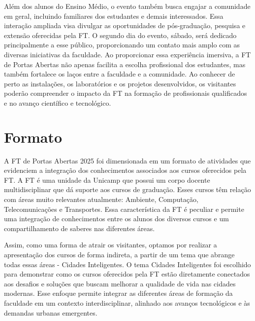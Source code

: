 \documentclass[
  letterpaper,
  DIV=11,
  numbers=noendperiod]{scrreprt}
\begin{document}
Além dos alunos do Ensino Médio, o evento também busca engajar a
comunidade em geral, incluindo familiares dos estudantes e demais
interessados. Essa interação ampliada visa divulgar as oportunidades de
pós-graduação, pesquisa e extensão oferecidas pela FT. O segundo dia do
evento, sábado, será dedicado principalmente a esse público,
proporcionando um contato mais amplo com as diversas iniciativas da
faculdade. Ao proporcionar essa experiência imersiva, a FT de Portas
Abertas não apenas facilita a escolha profissional dos estudantes, mas
também fortalece os laços entre a faculdade e a comunidade. Ao conhecer
de perto as instalações, os laboratórios e os projetos desenvolvidos, os
visitantes poderão compreender o impacto da FT na formação de
profissionais qualificados e no avanço científico e tecnológico.


\chapter{Formato}\label{formato}

A FT de Portas Abertas 2025 foi dimensionada em um formato de atividades
que evidenciem a integração dos conhecimentos associados aos cursos
oferecidos pela FT. A FT é uma unidade da Unicamp que possui um corpo
docente multidisciplinar que dá suporte aos cursos de graduação. Esses
cursos têm relação com áreas muito relevantes atualmente: Ambiente,
Computação, Telecomunicações e Transportes. Essa característica da FT é
peculiar e permite uma integração de conhecimentos entre os alunos dos
diversos cursos e um compartilhamento de saberes nas diferentes áreas.

Assim, como uma forma de atrair os visitantes, optamos por realizar a
apresentação dos cursos de forma indireta, a partir de um tema que
abrange todas essas áreas - Cidades Inteligentes. O tema Cidades
Inteligentes foi escolhido para demonstrar como os cursos oferecidos
pela FT estão diretamente conectados aos desafios e soluções que buscam
melhorar a qualidade de vida nas cidades modernas. Esse enfoque permite
integrar as diferentes áreas de formação da faculdade em um contexto
interdisciplinar, alinhado aos avanços tecnológicos e às demandas
urbanas emergentes.
\end{document}
